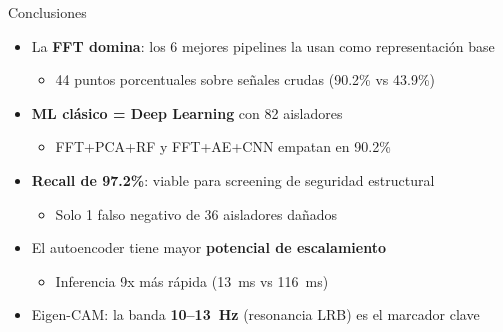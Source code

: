 \documentclass[aspectratio=169, 11pt]{beamer}
\begin{document}
\begin{frame}{Conclusiones}
    \begin{itemize}
        \setlength\itemsep{0.5em}
        \item La \textbf{FFT domina}: los 6 mejores pipelines la usan como representación base
        \begin{itemize}
            \item 44 puntos porcentuales sobre señales crudas (90.2\% vs 43.9\%)
        \end{itemize}
        \item \textbf{ML clásico = Deep Learning} con 82 aisladores
        \begin{itemize}
            \item FFT+PCA+RF y FFT+AE+CNN empatan en 90.2\%
        \end{itemize}
        \item \textbf{Recall de 97.2\%}: viable para screening de seguridad estructural
        \begin{itemize}
            \item Solo 1 falso negativo de 36 aisladores dañados
        \end{itemize}
        \item El autoencoder tiene mayor \textbf{potencial de escalamiento}
        \begin{itemize}
            \item Inferencia 9x más rápida (13~ms vs 116~ms)
        \end{itemize}
        \item Eigen-CAM: la banda \textbf{10--13~Hz} (resonancia LRB) es el marcador clave
    \end{itemize}
\end{frame}
\end{document}
